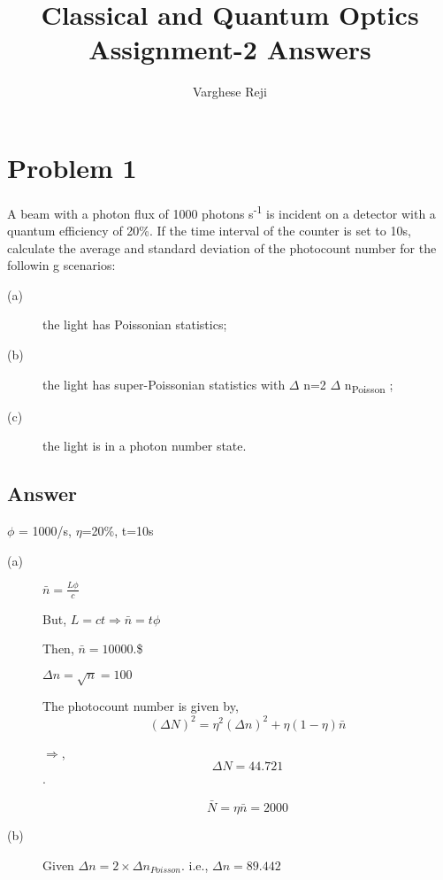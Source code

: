 \documentclass[a4paper,11pt]{article}
\author{Varghese Reji}
\date{}
\title{Classical and Quantum Optics\\\medskip
\large Assignment-2 Answers}
\begin{document}
\maketitle

\section*{Problem 1}
\label{sec:orged36dcd}

A beam with a photon flux of 1000 photons s\textsuperscript{-1} is incident on a detector with a quantum efficiency of 20\%. If the time interval of the counter is set to 10s, calculate the average and standard deviation of the photocount number for the followin g scenarios:
\begin{description}
\item[{(a)}] the light has Poissonian statistics;
\item[{(b)}] the light has super-Poissonian statistics with \(\Delta\) n=2\texttimes{} \(\Delta\) n\textsubscript{Poisson} ;
\item[{(c)}] the light is in a photon number state.
\end{description}

\subsection*{Answer}
\label{sec:orge5a9ebf}
\(\phi\) = 1000/s, \(\eta\)=20\%, t=10s

\begin{description}
\item[{(a)}] \(\bar{n} = \frac{L \phi}{c}\)

But, \(L=ct \Rightarrow \bar{n} = t \phi\)

Then, \(\bar{n} = 10000\).\$

\(\Delta n = \sqrt{n} = 100\)

The photocount number is given by, $$(\Delta N)^2 = \eta^2(\Delta n)^2 + \eta(1-\eta) \bar{n}$$

\(\Rightarrow\), $$\Delta N = 44.721$$.

$$\bar{N} = \eta \bar{n} = 2000$$
\end{description}


\begin{description}
\item[{(b)}] Given \(\Delta n = 2\times \Delta n_{Poisson}\).
i.e., \(\Delta n = 89.442\)
\end{description}
\end{document}
